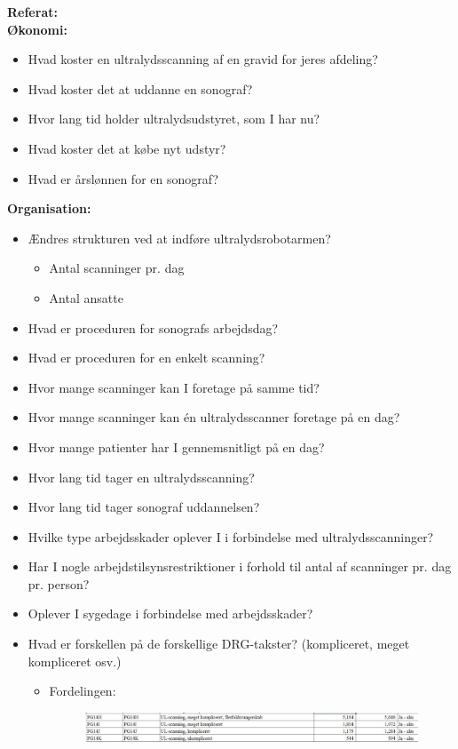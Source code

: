 \textbf{Referat:}\\
\textbf{Økonomi:}
\begin{itemize}
\item Hvad koster en ultralydsscanning af en gravid for jeres afdeling?
\item Hvad koster det at uddanne en sonograf? 
\item Hvor lang tid holder ultralydsudstyret, som I har nu? 
\item Hvad koster det at købe nyt udstyr?
\item Hvad er årslønnen for en sonograf?
\end{itemize}
\textbf{Organisation:}
\begin{itemize}
\item Ændres strukturen ved at indføre ultralydsrobotarmen? 
\begin{itemize}
\item Antal scanninger pr. dag 
\item Antal ansatte
\end{itemize}
\item Hvad er proceduren for sonografs arbejdsdag?
\item Hvad er proceduren for en enkelt scanning?
\item Hvor mange scanninger kan I foretage på samme tid?
\item Hvor mange scanninger kan én ultralydsscanner foretage på en dag?
\item Hvor mange patienter har I gennemsnitligt på en dag? 
\item Hvor lang tid tager en ultralydsscanning?
\item Hvor lang tid tager sonograf uddannelsen?
\item Hvilke type arbejdsskader oplever I i forbindelse med ultralydsscanninger?
\item Har I nogle arbejdstilsynsrestriktioner i forhold til antal af scanninger pr. dag pr. person? 
\item Oplever I sygedage i forbindelse med arbejdsskader?
\item Hvad er forskellen på de forskellige DRG-takster? (kompliceret, meget kompliceret osv.)
\begin{itemize}
\item Fordelingen:
\begin{figure}[htb]
    \includegraphics{Figurer/scanning}
\end{figure}
\end{itemize}
\end{itemize}
